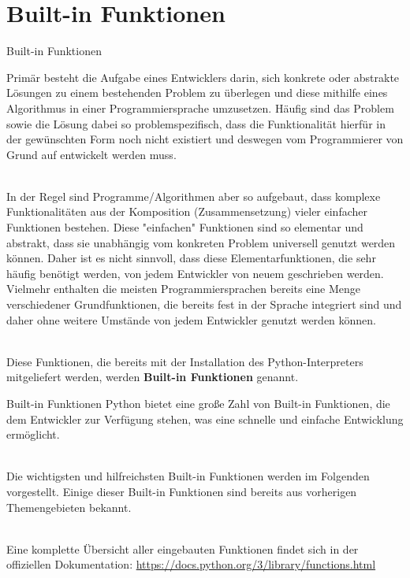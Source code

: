 \newcommand{\decktitle}{Python III - Kontrollstrukturen}

%
%


		
\section{Built-in Funktionen}
    \label{sec:builtin-func}

    \begin{frame}{Built-in Funktionen}
    
        Primär besteht die Aufgabe eines Entwicklers darin, sich konkrete oder abstrakte Lösungen zu einem bestehenden Problem zu überlegen und diese mithilfe eines Algorithmus in einer Programmiersprache umzusetzen. Häufig sind das Problem sowie die Lösung dabei so problemspezifisch, dass die Funktionalität hierfür in der gewünschten Form noch nicht existiert und deswegen vom Programmierer von Grund auf entwickelt werden muss. \\~\
        
        In der Regel sind Programme/Algorithmen aber so aufgebaut, dass komplexe Funktionalitäten aus der Komposition (Zusammensetzung) vieler einfacher Funktionen bestehen. Diese "einfachen" Funktionen sind so elementar und abstrakt, dass sie unabhängig vom konkreten Problem universell genutzt werden können. Daher ist es nicht sinnvoll, dass diese Elementarfunktionen, die sehr häufig benötigt werden, von jedem Entwickler von neuem geschrieben werden. Vielmehr enthalten die meisten Programmiersprachen bereits eine Menge verschiedener Grundfunktionen, die bereits fest in der Sprache integriert sind und daher ohne weitere Umstände von jedem Entwickler genutzt werden können. \\~\
        
        Diese Funktionen, die bereits mit der Installation des Python-Interpreters mitgeliefert werden, werden \textbf{Built-in Funktionen} genannt. 
        
    \end{frame}
    
    \begin{frame}{Built-in Funktionen}
        Python bietet eine große Zahl von Built-in Funktionen, die dem Entwickler zur Verfügung stehen, was eine schnelle und einfache Entwicklung ermöglicht. \\~\
        
        Die wichtigsten und hilfreichsten Built-in Funktionen werden im Folgenden vorgestellt. Einige dieser Built-in Funktionen sind bereits aus vorherigen Themengebieten bekannt. \\~\
        
        Eine komplette Übersicht aller eingebauten Funktionen findet sich in der offiziellen Dokumentation: \href{https://docs.python.org/3/library/functions.html}{https://docs.python.org/3/library/functions.html}
    \end{frame}    
    
